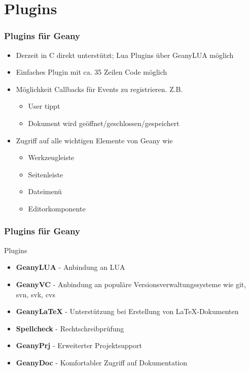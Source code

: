 \documentclass[compress]{beamer}
\begin{document}
\section{Plugins}
\begin{frame}
	\frametitle{Plugins für Geany}
	\begin{block}{}
		\begin{itemize}
			\item Derzeit in C direkt unterstützt; Lua Plugins über
				  GeanyLUA möglich
			\item Einfaches Plugin mit ca. 35 Zeilen Code möglich
			\item Möglichkeit Callbacks für Events zu registrieren. Z.B.
				\begin{itemize}
					\item User tippt
					\item Dokument wird geöffnet/geschlossen/gespeichert
				\end{itemize}
			\item Zugriff auf alle wichtigen Elemente von Geany wie
				\begin{itemize}
					\item Werkzeugleiste
					\item Seitenleiste
					\item Dateimenü
					\item Editorkomponente
				\end{itemize}
		\end{itemize}
	\end{block}
\end{frame}

\begin{frame}
	\frametitle{Plugins für Geany}
	\begin{block}{Plugins}
		\begin{itemize}
			\item \textbf{GeanyLUA} - Anbindung an LUA
			\item \textbf{GeanyVC} - Anbindung an populäre
				Versions\-ver\-waltungs\-systeme wie git, svn, svk, cvs
			\item \textbf{GeanyLaTeX} - Unterstützung bei Erstellung von
				\LaTeX-Dokumenten
			\item \textbf{Spellcheck} - Rechtschreibprüfung
			\item \textbf{GeanyPrj} - Erweiterter Projektsupport
			\item \textbf{GeanyDoc} - Komfortabler Zugriff auf Dokumentation
		\end{itemize}
	\end{block}
\end{frame}
\end{document}
